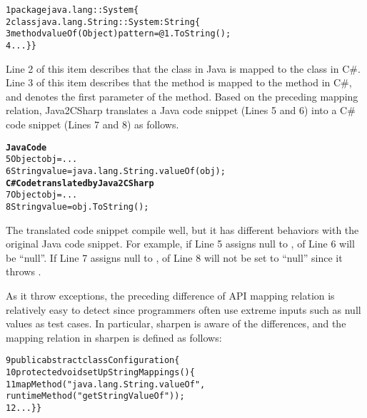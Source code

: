 \begin{CodeOut}%
\begin{alltt}
1 package java.lang::System\{
2  class java.lang.String :: System:String\{
3   method valueOf(Object) { pattern = @1.ToString(); }
4   ...\}\}
\end{alltt}
\end{CodeOut}

Line 2 of this item describes that the  class in Java is mapped to the  class in C\#. Line 3 of this item describes that the  method is mapped to the  method in C\#, and  denotes the first parameter of the  method. Based on the preceding mapping relation, Java2CSharp translates a Java code snippet (Lines 5 and 6) into a C\# code snippet (Lines 7 and 8) as follows.

\begin{CodeOut}%
\begin{alltt}
\textbf{  Java Code}
5 Object obj = ...
6 String value = java.lang.String.valueOf(obj);
\textbf{  C# Code translated by Java2CSharp}
7 Object obj = ...
8 String value = obj.ToString();
\end{alltt}
\end{CodeOut}

The translated code snippet compile well, but it has different behaviors with the original Java code snippet. For example, if Line 5 assigns null to ,  of Line 6 will be ``null''. If Line 7 assigns null to ,  of Line 8 will not be set to ``null'' since it throws .

As it throw exceptions, the preceding difference of API mapping relation is relatively easy to detect since programmers often use extreme inputs such as null values as test cases. In particular, sharpen is aware of the differences, and the mapping relation in sharpen is defined as follows:

\begin{CodeOut}
\begin{alltt}
9 public abstract class Configuration \{
10 protected void setUpStringMappings() \{
11   mapMethod("java.lang.String.valueOf",
              runtimeMethod("getStringValueOf"));
12  ...\} \}
\end{alltt}
\end{CodeOut}

